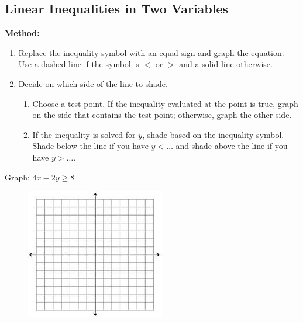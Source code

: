 
\setcounter{section}{9}
\setcounter{subsection}{3}

\subsection{Linear Inequalities in Two Variables}

\begin{mdframed}
\textbf{Method:}
\begin{enumerate}
\item Replace the inequality symbol with an equal sign and graph the equation. Use a dashed line if the symbol is $<$ or $>$ and a solid line otherwise.
\item Decide on which side of the line to shade.
\begin{enumerate}
\item Choose a test point. If the inequality evaluated at the point is true, graph on the side that contains the test point; otherwise, graph the other side.
\item If the inequality is solved for $y$, shade based on the inequality symbol. Shade below the line if you have $y <\dots$ and shade above the line if you have $y > \dots$.
\end{enumerate}
\end{enumerate}
\end{mdframed}

\vspace{.3in}

\begin{example}
Graph: $4x - 2y \ge 8$
\begin{figure}[h]
\hfill\includegraphics[scale=1.25]{images/plane}
\end{figure}
\vspace{1in}
\end{example}

\newpage

